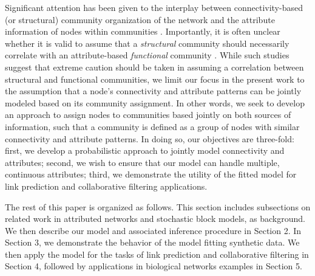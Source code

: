 Significant attention has been given to the interplay between connectivity-based (or structural) community organization of the network and the attribute information of nodes within communities \cite{both}. Importantly, it is often unclear whether it is valid to assume that a \emph{structural} community should necessarily correlate with an attribute-based \emph{functional} community \cite{hric,peel2017ground,jureGroundTruth}. While such studies suggest that extreme caution should be taken in assuming a correlation between structural and functional communities, we limit our focus in the present work to the assumption that a node's connectivity and attribute patterns can be jointly modeled based on its community assignment. In other words, we seek to develop an approach to assign nodes to communities based jointly on both sources of information, such that a community is defined as a group of nodes with similar connectivity and attribute patterns. In doing so, our objectives are three-fold: first, we develop a probabilistic approach to jointly model connectivity and attributes; second, we wish to ensure that our model can handle multiple, continuous attributes; third, we demonstrate the utility of the fitted model for link prediction and collaborative filtering applications.

The rest of this paper is organized as follows. This section includes subsections on related work in attributed networks and stochastic block models, as background. We then describe our model and associated inference procedure in Section 2. In Section 3, we demonstrate the behavior of the model fitting synthetic data. We then apply the model for the tasks of link prediction and collaborative filtering in Section 4, followed by applications in biological networks examples in Section 5.


